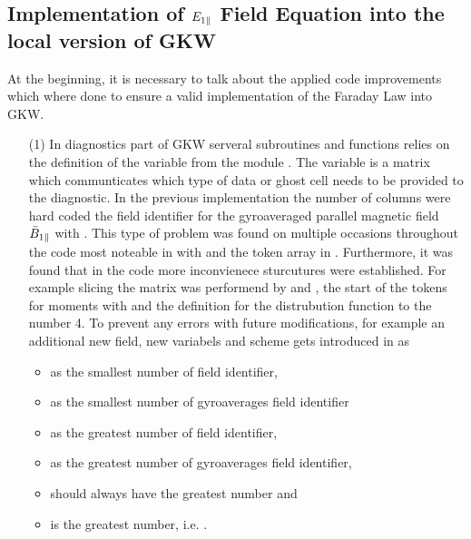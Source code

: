 \newpage

\subsection{Implementation of $E_{1\parallel}$ Field Equation into the local version of GKW}
\label{sub:implementationFieldEpar}

At the beginning, it is necessary to talk about the applied code improvements which where done to ensure a valid implementation of the Faraday Law into GKW.
\begin{enumerate}
    \item[(1)] In diagnostics part of GKW serveral subroutines and functions relies on the definition of the variable  from the module . The variable  is a matrix which communticates which type of data or ghost cell needs to be provided to the diagnostic. In the previous implementation the number of columns were hard coded the field identifier for the gyroaveraged parallel magnetic field $\bar{B}_{1\parallel}$ with . This type of problem was found on multiple occasions throughout the code most noteable in  with  and the token array in . Furthermore, it was found that in the code more inconvienece sturcutures were established. For example slicing the  matrix was performend by  and , the start of the tokens for moments with  and the definition for the distrubution function to the number 4. To prevent any errors with future modifications, for example an additional new field, new variabels and scheme gets introduced in  as
    \begin{itemize}
        \item {} as the smallest number of field identifier, 
        \item {} as the smallest number of gyroaverages field identifier
        \item {} as the greatest number of field identifier, 
        \item {} as the greatest number of gyroaverages field identifier,
        \item {} should always have the greatest number and
        \item {} is the greatest number, i.e. .

\end{itemize}
\end{enumerate}
